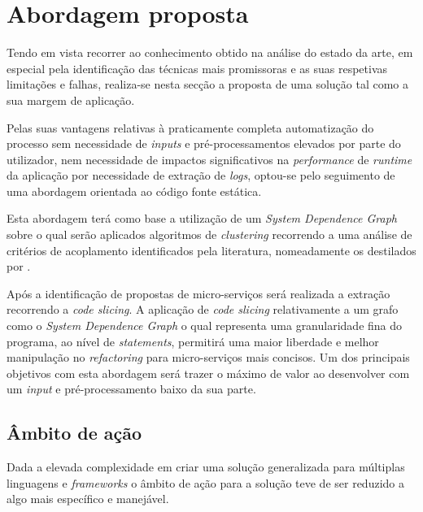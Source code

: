 \chapter{Abordagem proposta}

    Tendo em vista recorrer ao conhecimento obtido na análise do estado da arte, em especial pela identificação das técnicas mais promissoras e as suas respetivas limitações e falhas, realiza-se nesta secção a proposta de uma solução tal como a sua margem de aplicação.

    Pelas suas vantagens relativas à praticamente completa automatização do processo sem necessidade de \textit{inputs} e pré-processamentos elevados por parte do utilizador, nem necessidade de impactos significativos na \textit{performance} de \textit{runtime} da aplicação por necessidade de extração de \textit{logs}, optou-se pelo seguimento de uma abordagem orientada ao código fonte estática.
    
    Esta abordagem terá como base a utilização de um \textit{System Dependence Graph} sobre o qual serão aplicados algoritmos de \textit{clustering} recorrendo a uma análise de critérios de acoplamento identificados pela literatura, nomeadamente os destilados por \cite{gysel16_service_cutter}.
    
    Após a identificação de propostas de micro-serviços será realizada a extração recorrendo a \textit{code slicing}. A aplicação de \textit{code slicing} relativamente a um grafo como o \textit{System Dependence Graph} o qual representa uma granularidade fina do programa, ao nível de \textit{statements}, permitirá uma maior liberdade e melhor manipulação no \textit{refactoring} para micro-serviços mais concisos. Um dos principais objetivos com esta abordagem será trazer o máximo de valor ao desenvolver com um \textit{input} e pré-processamento baixo da sua parte.
    
\section{Âmbito de ação}

    Dada a elevada complexidade em criar uma solução generalizada para múltiplas linguagens e \textit{frameworks} o âmbito de ação para a solução teve de ser reduzido a algo mais específico e manejável.
    
